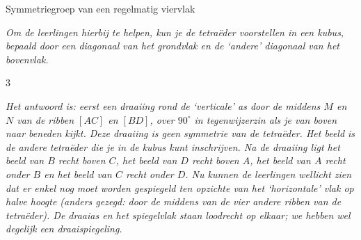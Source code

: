 \begin{lesactiviteit}{Symmetriegroep van een regelmatig viervlak}
\begin{vraagenantwoord}[resume]
 
 
 
 
 
 
 
 
 \emph{Om de leerlingen hierbij te helpen, kun je de tetraëder voorstellen in een kubus, bepaald door een diagonaal van het grondvlak en de `andere' diagonaal van het bovenvlak.} 
 
 \begin{multicols}{3}
 
 \end{multicols}
 
 \emph{Het antwoord is: eerst een draaiing rond de `verticale' as door de middens $M$ en $N$ van de ribben $[AC]$ en $[BD]$, over $90^\circ$ in tegenwijzerzin als je van boven naar beneden kijkt. Deze draaiing is geen symmetrie van de tetraëder. Het beeld is de andere tetraëder die je in de kubus kunt inschrijven. Na de draaiing ligt het beeld van $B$ recht boven $C$, het beeld van $D$ recht boven $A$, het beeld van $A$ recht onder $B$ en het beeld van $C$ recht onder $D$. Nu kunnen de leerlingen wellicht zien dat er enkel nog moet worden gespiegeld ten opzichte van het `horizontale' vlak op halve hoogte (anders gezegd: door de middens van de vier andere ribben van de tetraëder). De draaias en het spiegelvlak staan loodrecht op elkaar; we hebben wel degelijk een draaispiegeling.}
 

\end{vraagenantwoord}
\end{lesactiviteit}
